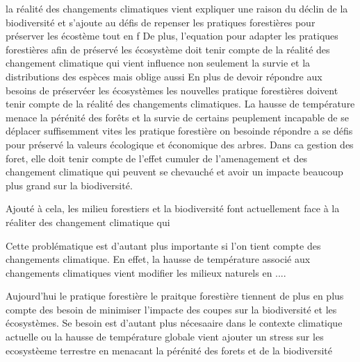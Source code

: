     la réalité des changements climatiques vient expliquer une raison du déclin de la biodiversité et s'ajoute au défis de repenser les pratiques forestières pour préserver les écostème tout en f
    De plus, l'equation pour adapter les pratiques forestières afin de préservé les écosystème doit tenir compte de la réalité des changement climatique qui vient influence non seulement la survie et la distributions des espèces mais oblige aussi 
    En plus de devoir répondre aux besoins de préservéer les écosystèmes les nouvelles pratique forestières doivent tenir compte de la réalité des changements climatiques.
    La hausse de température menace la pérénité des forêts et la survie de certains peuplement incapable de se déplacer suffisemment vites
    les pratique forestière on besoinde répondre a se défis pour préservé la valeurs écologique et économique des arbres.
    Dans ca gestion des foret, elle doit tenir compte de l'effet cumuler de l'amenagement et des changement climatique qui peuvent se chevauché et avoir un impacte beaucoup plus grand sur la biodiversité.

    Ajouté à cela, les milieu forestiers et la biodiversité font actuellement face à la réaliter des changement climatique qui 

Cette problématique est d'autant plus importante si l'on tient compte des changements climatique. 
En effet, la hausse de température associé aux changements climatiques vient modifier les milieux naturels en ....


Aujourd'hui le pratique forestière le praitque forestière tiennent de plus en plus compte des besoin de minimiser l'impacte des coupes sur la biodiversité et les écosystèmes.
Se besoin est d'autant plus nécesaaire dans le contexte climatique actuelle ou la hausse de température globale vient ajouter un stress sur les ecosystèeme terrestre en menacant la pérénité des forets et de la biodiversité

